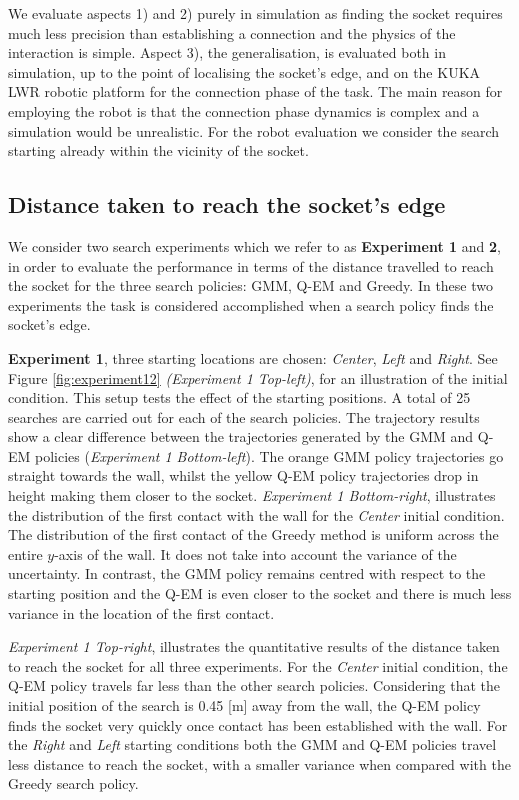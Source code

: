 \documentclass[final,5p,times,twocolumn]{elsarticle}
\begin{document}
We evaluate aspects 1) and 2) purely in simulation as finding the socket requires much less precision than establishing a 
connection and the physics of the interaction is simple. Aspect 3), the generalisation, is evaluated both in simulation,
up to the point of localising the socket's edge, and on the KUKA LWR robotic platform
for the connection phase of the task. The main reason for employing the robot is that the connection phase dynamics is 
complex and a simulation would be unrealistic. For the robot evaluation we consider 
the search starting already within the vicinity of the socket.

\subsection{Distance taken to reach the socket's edge}

We consider two search experiments which we refer to as \textbf{Experiment 1} and \textbf{2}, in order to evaluate the performance 
in terms of the distance travelled to reach the socket for the three search policies: GMM, Q-EM and Greedy. In these two 
experiments the task is considered accomplished when a search policy finds the socket's edge. 

\textbf{Experiment 1}, three starting locations are chosen: \textit{Center}, \textit{Left} and \textit{Right}. 
See Figure \ref{fig:experiment12} \textit{(Experiment 1 Top-left)}, for an illustration of the initial condition. 
This setup tests the effect of the starting positions. A total of 25 searches are carried out for each of the search policies.
The trajectory results show a clear difference between the trajectories generated by the GMM and Q-EM policies (\textit{Experiment 1 Bottom-left}). 
The orange GMM policy trajectories go straight towards the wall, whilst the yellow Q-EM policy trajectories drop in height 
making them closer to the socket. 
\textit{Experiment 1 Bottom-right}, illustrates the distribution of the first contact with the wall for the \textit{Center} initial 
condition. The distribution of the first contact of the Greedy method is uniform across the entire $y$-axis of the wall. 
It does not take into account the variance of the uncertainty. In contrast, the GMM policy remains centred 
with respect to the starting position and the Q-EM is even closer to the socket and there is much less variance in 
the location of the first contact.

\textit{Experiment 1 Top-right}, illustrates the quantitative results of the distance taken to reach the socket for 
all three experiments. For the \textit{Center} initial condition, the Q-EM policy travels far less than the other search policies. 
Considering that the initial position of the search is 0.45 [m] away from the wall, the Q-EM policy finds the socket very 
quickly once contact has been established with the wall. For the \textit{Right} and \textit{Left} starting conditions both 
the GMM and Q-EM policies travel less distance to reach the socket, with a smaller variance when compared with the Greedy search policy.
\end{document}

